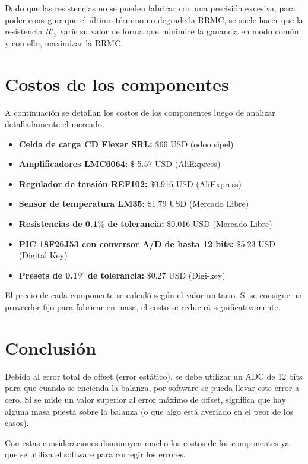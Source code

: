 \documentclass[12pt,A4paper,titlepage]{article}
\begin{document}
\hspace{1mm} Dado que las resistencias no se pueden fabricar con una precisión excesiva, para poder conseguir que el último término no degrade la RRMC, se suele hacer que la resistencia \(R'_3 \) varíe su valor de forma que minimice la ganancia en modo común y con ello, maximizar la RRMC.


\section{Costos de los componentes}
\hspace{1mm} A continuación se detallan los costos de los componentes luego de analizar detalladamente el mercado. 

\begin{itemize}
    \item \textbf{Celda de carga CD Flexar SRL:} \(\$ \)66 USD (odoo sipel)
    \item \textbf{Amplificadores LMC6064:} \(\$ \) 5.57 USD (AliExpress)
    \item \textbf{Regulador de tensión REF102:} \(\$ \)0.916 USD (AliExpress)
    \item \textbf{Sensor de temperatura LM35:} \(\$ \)1.79 USD (Mercado Libre)
    \item \textbf{Resistencias de 0.1\(\% \) de tolerancia:} \(\$ \)0.016 USD (Mercado Libre)
    \item \textbf{PIC 18F26J53 con conversor A/D de hasta 12 bits:} \(\$ \)5.23 USD (Digital Key)
    \item \textbf{Presets de 0.1\(\% \) de tolerancia:} \(\$ \)0.27 USD (Digi-key)
\end{itemize}

\hspace{1mm} El precio de cada componente se calculó según el valor unitario. Si se consigue un proveedor fijo para fabricar en masa, el costo se reducirá significativamente.

\section{Conclusión}

\hspace{1mm}Debido al error total de offset (error estático), se debe utilizar un ADC de 12 bits para que cuando se encienda la balanza, por software se pueda llevar este error a cero. Si se mide un valor superior al error máximo de offset, significa que hay alguna masa puesta sobre la balanza (o que algo está averiado en el peor de los casos). 

Con estas consideraciones disminuyen mucho los costos de los componentes ya que se utiliza el software para corregir los errores.
\end{document}
